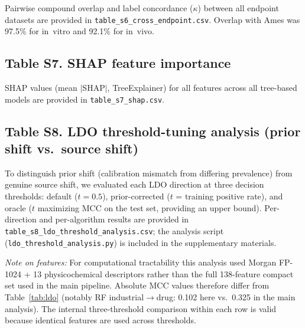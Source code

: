 Pairwise compound overlap and label concordance ($\kappa$) between all endpoint datasets are provided in \texttt{table\_s6\_cross\_endpoint.csv}. Overlap with Ames was 97.5\% for in~vitro and 92.1\% for in~vivo.

\subsection*{Table S7. SHAP feature importance}

SHAP values (mean $|$SHAP$|$, TreeExplainer) for all features across all tree-based models are provided in \texttt{table\_s7\_shap.csv}.

\subsection*{Table S8. LDO threshold-tuning analysis (prior shift vs.\ source shift)}

To distinguish prior shift (calibration mismatch from differing prevalence) from genuine source shift, we evaluated each LDO direction at three decision thresholds: default ($t=0.5$), prior-corrected ($t$ = training positive rate), and oracle ($t$ maximizing MCC on the test set, providing an upper bound). Per-direction and per-algorithm results are provided in \texttt{table\_s8\_ldo\_threshold\_analysis.csv}; the analysis script (\texttt{ldo\_threshold\_analysis.py}) is included in the supplementary materials.

\textit{Note on features:} For computational tractability this analysis used Morgan FP-1024 + 13 physicochemical descriptors rather than the full 138-feature compact set used in the main pipeline. Absolute MCC values therefore differ from Table~\ref{tab:ldo} (notably RF industrial$\to$drug: 0.102 here vs.\ 0.325 in the main analysis). The internal three-threshold comparison within each row is valid because identical features are used across thresholds.

